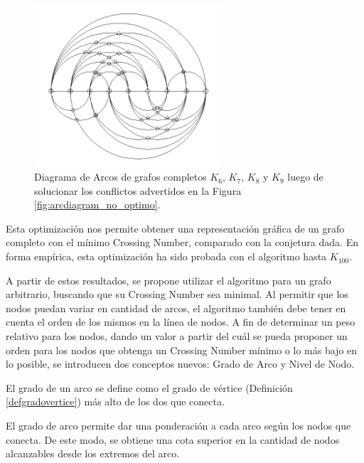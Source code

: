\begin{figure}
		\includegraphics[width=7cm]{imagenes/grafo_4_bn_opt.png}
		\caption{Diagrama de Arcos de grafos completos $K_6$, $K_7$, $K_8$ y $K_9$ luego de solucionar los conflictos advertidos en la Figura \ref{fig:arcdiagram_no_optimo}.}
		\label{fig:arcdiagram_optimo}
	\end{figure}
	
	
	Esta optimización nos permite obtener  una representación gráfica de un grafo completo con el mínimo Crossing Number, comparado con la conjetura dada. En forma empírica, esta  optimización  ha sido probada con el algoritmo hasta $K_{100}$.
	
	
	A partir de estos resultados,  se propone utilizar el algoritmo para un  grafo arbitrario, buscando que su Crossing Number sea minimal. Al permitir que los nodos puedan variar en cantidad de arcos, el algoritmo también debe tener en cuenta el orden de los mismos en la línea de nodos. A fin de  determinar un peso relativo para los nodos, dando un valor a partir del cuál se pueda proponer un orden para los nodos que obtenga un Crossing Number  mínimo o lo más bajo en lo posible, se introducen dos conceptos nuevos: Grado de Arco y Nivel de Nodo.
	

	\begin{definition}
		El grado de un arco se define como el grado de vértice (Definición \ref{defgradovertice}) más alto de los dos  que conecta. 
	\end{definition}
	
	El grado de arco permite dar una ponderación a cada arco según los nodos que conecta. De este  modo, se obtiene una cota superior en la cantidad de  nodos alcanzables desde los  extremos del arco.
	
